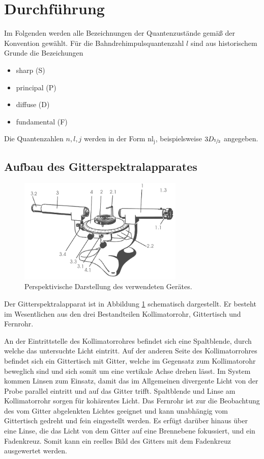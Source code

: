 \section{Durchf\"uhrung}
\label{sec:Durchfuehrung}
Im Folgenden werden alle Bezeichnungen der Quantenzustände gemäß der Konvention gewählt.
Für die Bahndrehimpulsquantenzahl $l$ sind aus historischem Grunde die Bezeichungen 
\begin{itemize}
\item[l=0]{sharp (S)}
\item[l=1]{principal (P)}
\item[l=2]{diffuse (D)}
\item[l=3]{fundamental (F)}
\end{itemize}
Die Quantenzahlen $n,l,j$ werden in der Form $\mathup{nl}_\mathup{j}$, beispielsweise $3D_{\sfrac{5}{2}}$ angegeben.
\subsection{Aufbau des Gitterspektralapparates}
\begin{figure}
	\centering
	\includegraphics[width=0.7\textwidth]{Bilder/Apparat.png}
	\caption{Perspektivische Darstellung des verwendeten Gerätes. \cite{skript}} 
	\label{fig:Gitterspektralapparat}
\end{figure}
Der Gitterspektralapparat ist in Abbildung \ref{fig:Gitterspektralapparat} schematisch dargestellt.
Er besteht im Wesentlichen aus den drei Bestandteilen Kollimatorrohr, Gittertisch und Fernrohr.

An der Eintrittstelle des Kollimatorrohres befindet sich eine Spaltblende, durch welche das untersuchte Licht eintritt.
Auf der anderen Seite des Kollimatorrohres befindet sich ein Gittertisch mit Gitter, welche im Gegensatz zum Kollimatorohr beweglich sind und sich somit um eine vertikale Achse drehen lässt. 
Im System kommen Linsen zum Einsatz, damit das im Allgemeinen divergente Licht von der Probe parallel eintritt und auf das Gitter trifft.
Spaltblende und Linse am Kollimatorrohr sorgen für kohärentes Licht.
Das Fernrohr ist zur die Beobachtung des vom Gitter abgelenkten Lichtes geeignet und kann unabhängig vom Gittertisch gedreht und fein eingestellt werden. 
Es erfügt darüber hinaus über eine Linse, die das Licht von dem Gitter auf eine Brennebene fokussiert, und ein Fadenkreuz.
Somit kann ein reelles Bild des Gitters mit dem Fadenkreuz ausgewertet werden.

